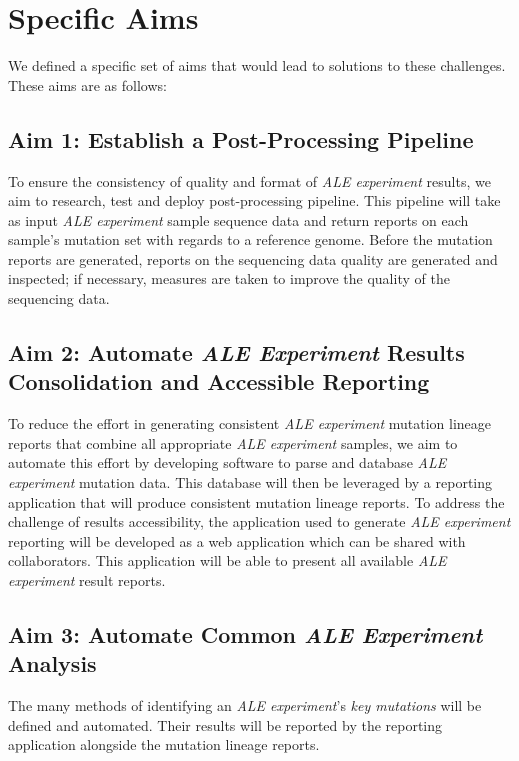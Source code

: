\documentclass[12pt,final,masters,chapterheads]{ucsd}  %
\begin{document}
\section{Specific Aims}

We defined a specific set of aims that would lead to solutions to these challenges. These aims are as follows:
\subsection{Aim 1: Establish a Post-Processing Pipeline}
To ensure the consistency of quality and format of \textit{ALE experiment} results, we aim to research, test and deploy post-processing pipeline. This pipeline will take as input \textit{ALE experiment} sample sequence data and return reports on each sample's mutation set with regards to a reference genome. Before the mutation reports are generated, reports on the sequencing data quality are generated and inspected; if necessary, measures are taken to improve the quality of the sequencing data.
\subsection{Aim 2: Automate \textit{ALE Experiment} Results Consolidation and Accessible Reporting}
To reduce the effort in generating consistent \textit{ALE experiment} mutation lineage reports that combine all appropriate \textit{ALE experiment} samples, we aim to automate this effort by developing software to parse and database \textit{ALE experiment} mutation data. This database will then be leveraged by a reporting application that will produce consistent mutation lineage reports. To address the challenge of results accessibility, the application used to generate \textit{ALE experiment} reporting will be developed as a web application which can be shared with collaborators. This application will be able to present all available \textit{ALE experiment} result reports.
\subsection{Aim 3: Automate Common \textit{ALE Experiment} Analysis}
%
%
The many methods of identifying an \textit{ALE experiment}'s \textit{key mutations} will be defined and automated. Their results will be reported by the reporting application alongside the mutation lineage reports.
\end{document}
